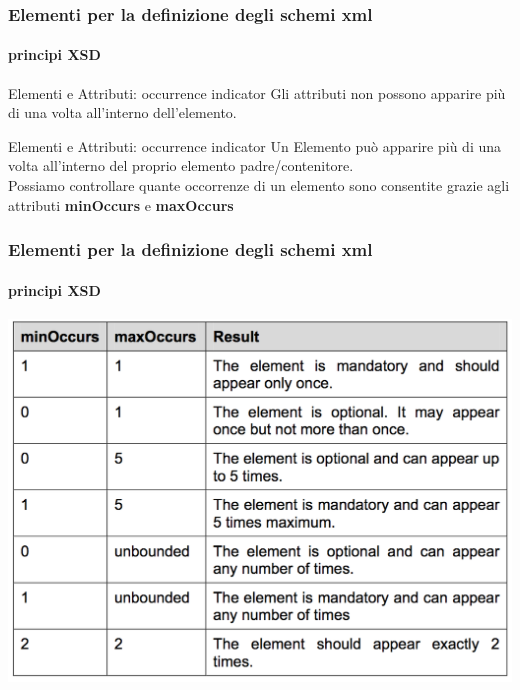 \begin{frame}
	\frametitle{Elementi per la definizione degli schemi xml}
	\framesubtitle{principi XSD}
	\addtocounter{nframe}{1}

	\begin{block}{Elementi e Attributi: occurrence indicator}
		Gli attributi non possono apparire più di una volta all'interno dell'elemento.
	\end{block}

	\begin{block}{Elementi e Attributi: occurrence indicator}
		Un Elemento può apparire più di una volta all'interno del proprio elemento padre/contenitore.
		\\Possiamo controllare quante occorrenze di un elemento sono consentite grazie agli attributi \textbf{minOccurs} e \textbf{maxOccurs}
	\end{block}
\end{frame}


\begin{frame}
	\frametitle{Elementi per la definizione degli schemi xml}
	\framesubtitle{principi XSD}
	\addtocounter{nframe}{1}



	\begin{center}
		\includegraphics[width=.95\textwidth]{imgs/tabellaMinMaxOccurs.png}
	\end{center}

\end{frame}


